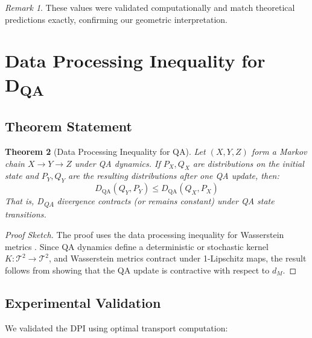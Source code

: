 \documentclass[11pt]{article}
\newtheorem{theorem}{Theorem}[section]
\theoremstyle{remark}
\newtheorem{remark}[theorem]{Remark}
\begin{document}
\begin{remark}
These values were validated computationally and match theoretical predictions exactly, confirming our geometric interpretation.
\end{remark}

\section{Data Processing Inequality for D\textsubscript{QA}}
\label{sec:dpi}

\subsection{Theorem Statement}

\begin{theorem}[Data Processing Inequality for QA]
\label{thm:dpi}
Let $(X, Y, Z)$ form a Markov chain $X \to Y \to Z$ under QA dynamics. If $P_X, Q_X$ are distributions on the initial state and $P_Y, Q_Y$ are the resulting distributions after one QA update, then:
\begin{equation}
D_{\text{QA}}(Q_Y, P_Y) \leq D_{\text{QA}}(Q_X, P_X)
\end{equation}
That is, D\textsubscript{QA} divergence contracts (or remains constant) under QA state transitions.
\end{theorem}

\begin{proof}[Proof Sketch]
The proof uses the data processing inequality for Wasserstein metrics \cite{villani2009optimal}. Since QA dynamics define a deterministic or stochastic kernel $K: \mathcal{T}^2 \to \mathcal{T}^2$, and Wasserstein metrics contract under 1-Lipschitz maps, the result follows from showing that the QA update is contractive with respect to $d_M$.
\end{proof}

\subsection{Experimental Validation}

We validated the DPI using optimal transport computation:
\end{document}
